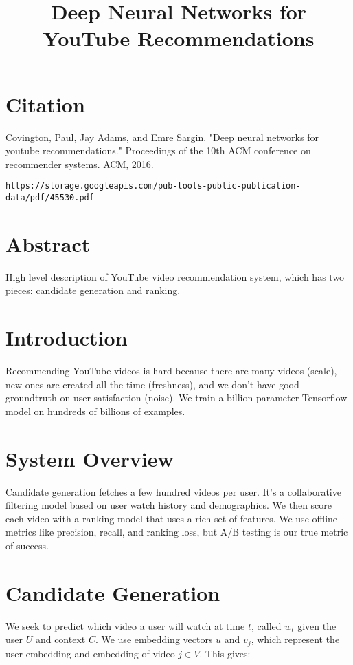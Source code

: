 \documentclass[a4paper]{article}
\title{Deep Neural Networks for YouTube Recommendations}
\date{}
\begin{document}
\maketitle

\section{Citation}
Covington, Paul, Jay Adams, and Emre Sargin. "Deep neural networks for youtube recommendations." Proceedings of the 10th ACM conference on recommender systems. ACM, 2016.

\begin{verbatim}
https://storage.googleapis.com/pub-tools-public-publication-data/pdf/45530.pdf
\end{verbatim}

\section{Abstract}
High level description of YouTube video recommendation system, which has
two pieces: candidate generation and ranking.

\section{Introduction}
Recommending YouTube videos is hard because there are many videos (scale), new
ones are created all the time (freshness), and we don't have good groundtruth
on user satisfaction (noise). We train a billion parameter Tensorflow model on
hundreds of billions of examples.

\section{System Overview}
Candidate generation fetches a few hundred videos per user. It's a collaborative
filtering model based on user watch history and demographics. We then score
each video with a ranking model that uses a rich set of features. We use offline
metrics like precision, recall, and ranking loss, but A/B testing is our true
metric of success.

\section{Candidate Generation}
We seek to predict which video a user will watch at time $t$, called $w_t$
given the user $U$ and context $C$. We use embedding vectors $u$ and $v_j$,
which represent the user embedding and embedding of video $j \in V$. This gives:
\end{document}

